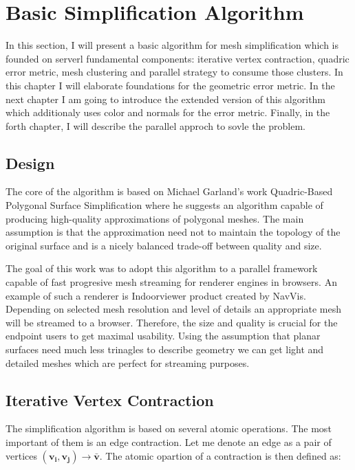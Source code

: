 \chapter{Basic Simplification Algorithm}
\thispagestyle{empty}%
In this section, I will present a basic algorithm for mesh simplification which is founded on serverl fundamental components: iterative vertex contraction, quadric error metric, mesh clustering and parallel strategy to consume those clusters. In this chapter I will elaborate foundations for the geometric error metric. In the next chapter I am going to introduce the extended version of this algorithm which additionaly uses color and normals for the error metric. Finally, in the forth chapter, I will describe the parallel approch to sovle the problem.
\section{Design}
The core of the algorithm is based on Michael Garland's work Quadric-Based Polygonal Surface Simplification \cite{garland99} where he suggests an algorithm capable of producing high-quality approximations of polygonal meshes. The main assumption is that the approximation need not to maintain the topology of the original surface and is a nicely balanced trade-off between quality and size. 

The goal of this work was to adopt this algorithm to a parallel framework capable of fast progresive mesh streaming \cite{yang01} for renderer engines in browsers. An example of such a renderer is Indoorviewer product created by NavVis. Depending on selected mesh resolution and level of details an appropriate mesh will be streamed to a browser. Therefore, the size and quality is crucial for the endpoint users to get maximal usability. Using the assumption that planar surfaces need much less trinagles to describe geometry we can get light and detailed meshes which are perfect for streaming purposes.
\clearpage

\section{Iterative Vertex Contraction}
The simplification algorithm is based on several atomic operations. The most important of them is an edge contraction. Let me denote an edge as a pair of vertices $(\mathbf{v_i}, \mathbf{v_j})\rightarrow\bar{\mathbf{v}}$. The atomic opartion of a contraction is then defined as:

